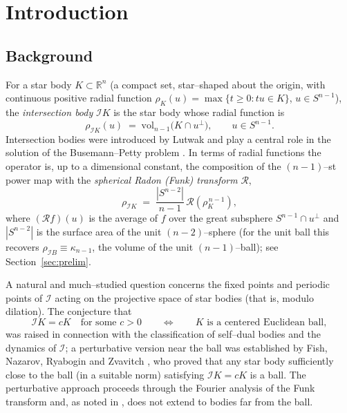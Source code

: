 \documentclass[11pt,reqno]{amsart}
\theoremstyle{plain}
\theoremstyle{definition}
\newcommand{\R}{\mathbb{R}}
\newcommand{\Sph}{S^{n-1}}
\newcommand{\Rad}{\mathcal{R}}
\newcommand{\IB}{\mathcal{I}}
\newcommand{\abs}[1]{\left\lvert #1 \right\rvert}
\begin{document}
\maketitle

\section{Introduction}

\subsection{Background}
For a star body $K\subset\R^n$ (a compact set, star--shaped about the origin,
with continuous positive radial function $\rho_K(u)=\max\{t\ge 0: tu\in K\}$,
$u\in\Sph$), the \emph{intersection body} $\IB K$ is the star body whose radial
function is
\[
   \rho_{\IB K}(u) \;=\; \mathrm{vol}_{n-1}\big(K\cap u^{\perp}\big),
   \qquad u\in\Sph .
\]
Intersection bodies were introduced by Lutwak and play a central role in the
solution of the Busemann--Petty problem
\cite{Lutwak1988,Gardner1994,GKS1999,Koldobsky2005}. In terms of radial
functions the operator is, up to a dimensional constant, the composition of the
$(n-1)$--st power map with the \emph{spherical Radon (Funk) transform} $\Rad$,
\begin{equation}\label{eq:IB-radial}
   \rho_{\IB K} \;=\; \frac{\abs{S^{n-2}}}{n-1}\,\Rad\!\left(\rho_K^{\,n-1}\right),
\end{equation}
where $(\Rad f)(u)$ is the average of $f$ over the great subsphere
$\Sph\cap u^{\perp}$ and $\abs{S^{n-2}}$ is the surface area of the unit
$(n-2)$--sphere (for the unit ball this recovers
$\rho_{\IB B}\equiv\kappa_{n-1}$, the volume of the unit $(n-1)$--ball); see
Section~\ref{sec:prelim}.

A natural and much--studied question concerns the fixed points and periodic
points of $\IB$ acting on the projective space of star bodies (that is, modulo
dilation). The conjecture that
\begin{equation}\label{eq:main-conj}
   \IB K = cK \quad\text{for some } c>0 \qquad\Longleftrightarrow\qquad
   K \text{ is a centered Euclidean ball},
\end{equation}
was raised in connection with the classification of self--dual bodies and the
dynamics of $\IB$; a perturbative version near the ball was established by
Fish, Nazarov, Ryabogin and Zvavitch \cite{FNRZ2011}, who proved that any
star body sufficiently close to the ball (in a suitable norm) satisfying
$\IB K = cK$ is a ball. The perturbative approach proceeds through the Fourier
analysis of the Funk transform and, as noted in \cite{FNRZ2011}, does not
extend to bodies far from the ball.
\end{document}
